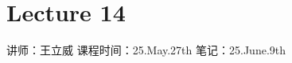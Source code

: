 \chapter{Lecture 14}

\begin{center}
    讲师：王立威 \qquad
    课程时间：25.May.27th \qquad 
    笔记：25.June.9th
\end{center}

\bigskip

